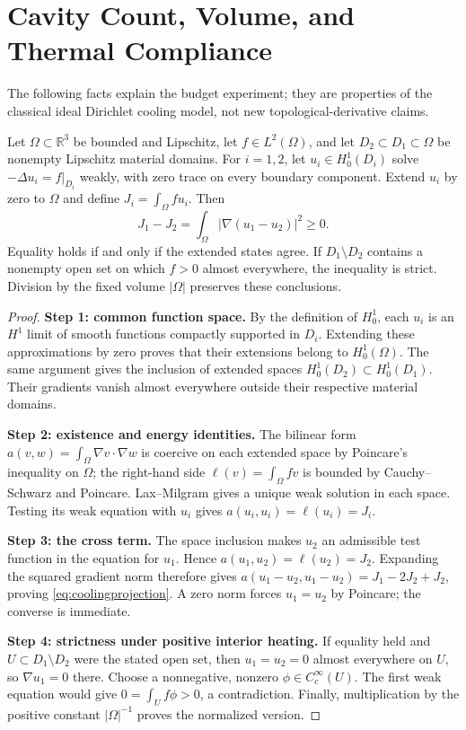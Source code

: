 \section{Cavity Count, Volume, and Thermal Compliance}
\label{app:cavitybudget}

The following facts explain the budget experiment; they are properties of the
classical ideal Dirichlet cooling model, not new topological-derivative claims.

\begin{proposition}
\label{prop:coolingmonotonicity}
Let $\Omega\subset\mathbb R^3$ be bounded and Lipschitz, let $f\in L^2(\Omega)$,
and let $D_2\subset D_1\subset\Omega$ be nonempty Lipschitz material domains.
For $i=1,2$, let $u_i\in H_0^1(D_i)$ solve
$-\Delta u_i=f|_{D_i}$ weakly, with zero trace on every boundary component.
Extend $u_i$ by zero to $\Omega$ and define
$J_i=\int_\Omega f u_i$. Then
\begin{equation}
 J_1-J_2=\int_\Omega |\nabla(u_1-u_2)|^2\ge0.
 \label{eq:coolingprojection}
\end{equation}
Equality holds if and only if the extended states agree. If $D_1\setminus D_2$
contains a nonempty open set on which $f>0$ almost everywhere, the inequality
is strict. Division by the fixed volume $|\Omega|$ preserves these conclusions.
\end{proposition}
\begin{proof}
\textbf{Step 1: common function space.}
By the definition of $H_0^1$, each $u_i$ is an $H^1$ limit of smooth functions
compactly supported in $D_i$. Extending these approximations by zero proves
that their extensions belong to $H_0^1(\Omega)$. The same argument gives the
inclusion of extended spaces $H_0^1(D_2)\subset H_0^1(D_1)$. Their gradients
vanish almost everywhere outside their respective material domains.

\textbf{Step 2: existence and energy identities.}
The bilinear form $a(v,w)=\int_\Omega\nabla v\cdot\nabla w$ is coercive on
each extended space by Poincare's inequality on $\Omega$; the right-hand side
$\ell(v)=\int_\Omega fv$ is bounded by Cauchy--Schwarz and Poincare.
Lax--Milgram gives a unique weak solution in each space. Testing its weak
equation with $u_i$ gives $a(u_i,u_i)=\ell(u_i)=J_i$.

\textbf{Step 3: the cross term.}
The space inclusion makes $u_2$ an admissible test function in the equation
for $u_1$. Hence $a(u_1,u_2)=\ell(u_2)=J_2$. Expanding the squared gradient norm
therefore gives $a(u_1-u_2,u_1-u_2)=J_1-2J_2+J_2$, proving
\cref{eq:coolingprojection}. A zero norm forces $u_1=u_2$ by Poincare; the
converse is immediate.

\textbf{Step 4: strictness under positive interior heating.}
If equality held and $U\subset D_1\setminus D_2$ were the stated open set,
then $u_1=u_2=0$ almost everywhere on $U$, so $\nabla u_1=0$ there. Choose a
nonnegative, nonzero $\phi\in C_c^\infty(U)$. The first weak equation would
give $0=\int_U f\phi>0$, a contradiction. Finally, multiplication by the
positive constant $|\Omega|^{-1}$ proves the normalized version.
\end{proof}

